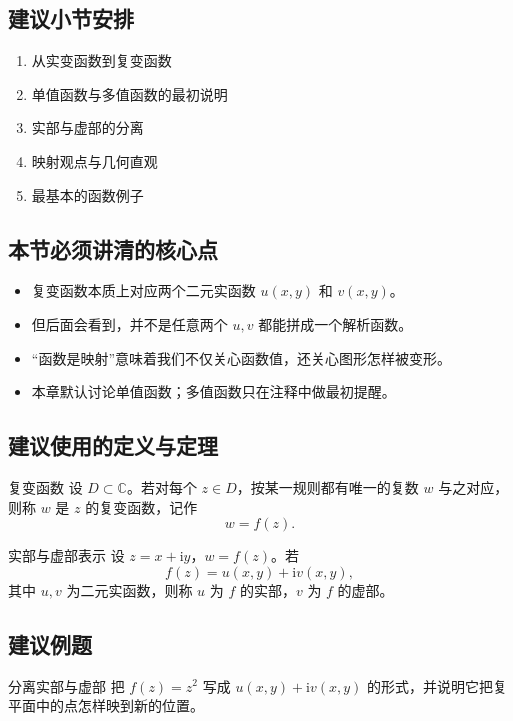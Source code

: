 \subsection*{建议小节安排}
\begin{enumerate}
    \item 从实变函数到复变函数
    \item 单值函数与多值函数的最初说明
    \item 实部与虚部的分离
    \item 映射观点与几何直观
    \item 最基本的函数例子
\end{enumerate}

\subsection*{本节必须讲清的核心点}
\begin{itemize}
    \item 复变函数本质上对应两个二元实函数 $u(x,y)$ 和 $v(x,y)$。
    \item 但后面会看到，并不是任意两个 $u,v$ 都能拼成一个解析函数。
    \item ``函数是映射''意味着我们不仅关心函数值，还关心图形怎样被变形。
    \item 本章默认讨论单值函数；多值函数只在注释中做最初提醒。
\end{itemize}

\subsection*{建议使用的定义与定理}
\begin{dingliyi}{复变函数}{}
设 $D\subset\mathbb{C}$。若对每个 $z\in D$，按某一规则都有唯一的复数 $w$ 与之对应，则称 $w$ 是 $z$ 的复变函数，记作
\[
    w=f(z).
\]
\end{dingliyi}

\begin{dingliyi}{实部与虚部表示}{}
设 $z=x+\mathrm{i}y$，$w=f(z)$。若
\[
    f(z)=u(x,y)+\mathrm{i}v(x,y),
\]
其中 $u,v$ 为二元实函数，则称 $u$ 为 $f$ 的实部，$v$ 为 $f$ 的虚部。
\end{dingliyi}

\subsection*{建议例题}
\begin{lizi}{分离实部与虚部}{}
把 $f(z)=z^2$ 写成 $u(x,y)+\mathrm{i}v(x,y)$ 的形式，并说明它把复平面中的点怎样映到新的位置。
\end{lizi}

